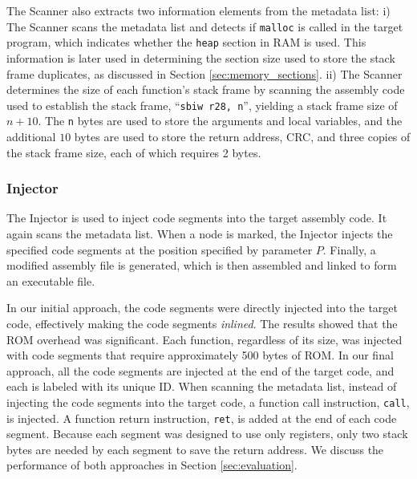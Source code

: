 The Scanner also extracts two information elements from the metadata list: i) The Scanner scans the metadata list and detects if \texttt{malloc} is called in the target program, which indicates whether the \texttt{heap} section in RAM is used. This information is later used in determining the section size used to store the stack frame duplicates, as discussed in Section \ref{sec:memory_sections}. ii) The Scanner determines the size of each function's stack frame by scanning the assembly code used to establish the stack frame, ``\texttt{sbiw r28, n}'', yielding a stack frame size of $n + 10$. The \texttt{n} bytes are used to store the arguments and local variables, and the additional $10$ bytes are used to store the return address, CRC, and three copies of the stack frame size, each of which requires 2 bytes.
\vspace{-15pt}
\subsubsection{Injector}
\vspace{-5pt}
The Injector is used to inject code segments into the target assembly code. It again scans the metadata list. When a node is marked, the Injector injects the specified code segments at the position specified by parameter $P$. Finally, a modified assembly file is generated, which is then assembled and linked to form an executable file.

In our initial approach, the code segments were directly injected into the target code, effectively making the code segments \textit{inlined}. The results showed that the ROM overhead was significant. Each function, regardless of its size, was injected with code segments that require approximately 500 bytes of ROM. In our final approach, all the code segments are injected at the end of the target code, and each is labeled with its unique ID. When scanning the metadata list, instead of injecting the code segments into the target code, a function call instruction, \texttt{call}, is injected. A function return instruction, \texttt{ret}, is added at the end of each code segment. Because each segment was designed to use only registers, only two stack bytes are needed by each segment to save the return address. We discuss the performance of both approaches in Section \ref{sec:evaluation}.
\vspace{-10pt}

